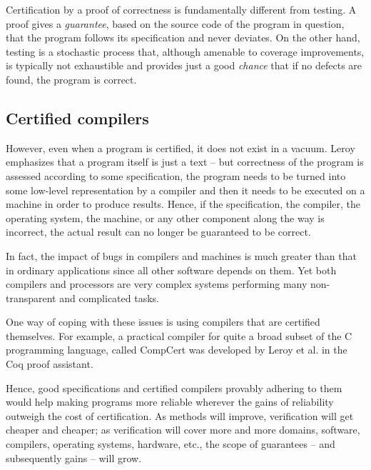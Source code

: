 Certification by a proof of correctness is fundamentally different from testing.
A proof gives a \emph{guarantee}, based on the source code of the program in question,
that the program follows its specification and never deviates. On the other hand, testing
is a stochastic
process that, although amenable to coverage improvements, is typically not exhaustible
and provides just a good \emph{chance} that if no defects are found, the program is correct.

\subsection{Certified compilers}

However, even when a program is certified, it does not exist in a vacuum. Leroy \cite{leroy09}
emphasizes that a program
itself is just a text -- but correctness of the program is assessed according to some specification,
the program needs to be turned into some low-level representation by a compiler and then it
needs to be executed on a machine in order to produce results. Hence, if the specification,
the compiler, the operating system, the machine, or any other component along the way
is incorrect, the actual result can no longer be guaranteed to be correct.

In fact, the impact of bugs in compilers and machines is much greater than that in ordinary
applications since all other software depends on them. Yet both compilers and processors
are very complex systems performing many non-transparent and complicated tasks.

One way of coping with these issues
is using compilers that are certified themselves.
For example, a practical compiler for quite
a broad subset of the C programming language, called CompCert \cite{leroy09} was developed
by Leroy et al. in the Coq proof assistant.

Hence, good specifications and certified compilers provably adhering to them would help
making programs more reliable wherever the gains of reliability outweigh the cost of
certification. As methods will improve, verification will get cheaper and cheaper; as
verification will cover more and more domains, software, compilers, operating systems,
hardware, etc., the scope of guarantees -- and subsequently gains -- will grow.

